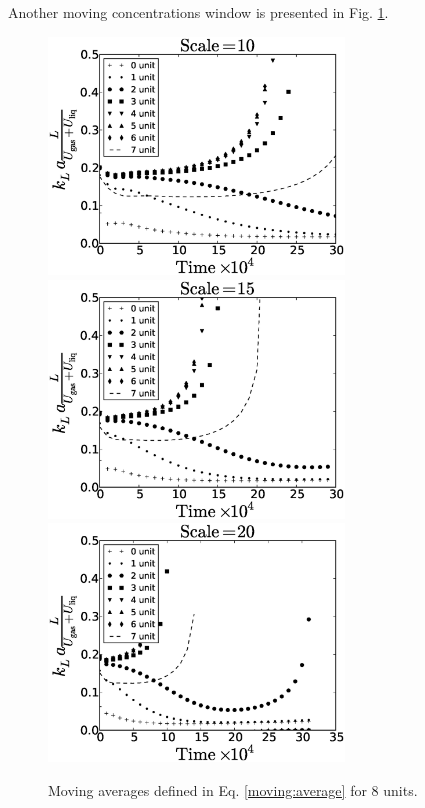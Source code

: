 \documentclass{article}
\begin{document}
Another moving concentrations window is presented in Fig. \ref{fig:moving:average:window8}.
\begin{figure}[htb!]
\includegraphics[width=0.7\textwidth]{Figures/aver_moving_window8scale10.eps}\\
\includegraphics[width=0.7\textwidth]{Figures/aver_moving_window8scale15.eps}\\
\includegraphics[width=0.7\textwidth]{Figures/aver_moving_window8scale20.eps}\\
\caption{Moving averages defined in Eq. \ref{moving:average} for $8$ units.
\label{fig:moving:average:window8}}
\end{figure}
\end{document}
